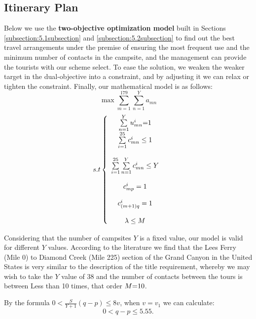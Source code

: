 \subsection{Itinerary Plan}
\noindent Below we use the \textbf{two-objective optimization model} built in Sections \ref{subsection:5.1subsection} and \ref  {subsection:5.2subsection} to find out the best travel arrangements under the premise of ensuring the most frequent use and the minimum number of contacts in the campsite, and the management can provide the tourists with our scheme select. To ease the solution, we weaken the weaker target in the dual-objective into a constraint, and by adjusting it we can relax or tighten the constraint. Finally, our mathematical model is as follows:
	\begin{equation}
	\max \sum\limits_{m = 1}^{179} {\sum\limits_{n = 1}^Y {{a_{mn}}} } \label{aa1}
	\end{equation}
	\begin{equation}
	s.t\left\{ {\begin{array}{*{20}{c}}
		{\sum\limits_{n = 1}^Y {u_{mn}^i} {\rm{ = }}1}\\
		{\sum\limits_{i = 1}^{25} {c_{mn}^i}  \le 1}\\
		\\
		{\sum\limits_{i = 1}^{25} {\sum\limits_{n = 1}^Y {c_{mn}^i \le Y} } }\\
		\\
		{c_{mp}^i = 1}\\
		\\
		{c_{(m + 1)q}^i = 1}\\
		\\
		{\lambda  \le M}
		\end{array}} \right.\label{aa1}
	\end{equation}
	\par Considering that the number of campsites $Y$ is a fixed value, our model is valid for different $Y$ values. According to the literature we find that the Lees Ferry (Mile 0) to Diamond Creek (Mile 225) section of the Grand Canyon in the United States is very similar to the description of the title requirement, whereby we may wish to take the $Y$ value of 38 and the number of contacts between the tours is between Less than 10 times, that order $M{\rm{ = }}10$.
	\par By the formula $0 < \frac{S}{{Y + 1}}(q - p) \le 8v$, when $v = {v_1}$ we can calculate:
	\begin{equation}
	0 < q - p \le 5.55.\label{aa1}
	\end{equation}
